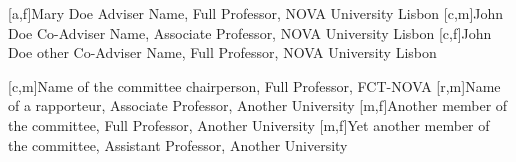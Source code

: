 [a,f]{Mary Doe Adviser Name, Full Professor, NOVA University Lisbon}
[c,m]{John Doe Co-Adviser Name, Associate Professor, NOVA University Lisbon}
[c,f]{John Doe other Co-Adviser Name, Full Professor, NOVA University Lisbon}

[c,m]{Name of the committee chairperson, Full Professor, FCT-NOVA}
[r,m]{Name of a rapporteur, Associate Professor, Another University}
[m,f]{Another member of the committee, Full Professor, Another University}
[m,f]{Yet another member of the committee, Assistant Professor, Another University}
